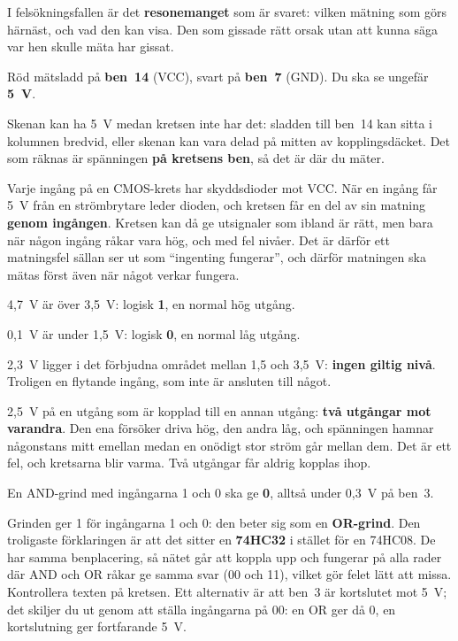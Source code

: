 

I felsökningsfallen är det \textbf{resonemanget} som är svaret: vilken mätning som görs härnäst, och
vad den kan visa. Den som gissade rätt orsak utan att kunna säga var hen skulle mäta har gissat.

Röd mätsladd på \textbf{ben~14} (VCC), svart på \textbf{ben~7} (GND). Du ska se ungefär
\textbf{5~V}.

Skenan kan ha 5~V medan kretsen inte har det: sladden till ben~14 kan sitta i kolumnen
bredvid, eller skenan kan vara delad på mitten av kopplingsdäcket. Det som räknas är spänningen
\textbf{på kretsens ben}, så det är där du mäter.

Varje ingång på en CMOS-krets har skyddsdioder mot VCC. När en ingång får 5~V från en
strömbrytare leder dioden, och kretsen får en del av sin matning \textbf{genom ingången}. Kretsen
kan då ge utsignaler som ibland är rätt, men bara när någon ingång råkar vara hög, och med fel
nivåer. Det är därför ett matningsfel sällan ser ut som \enquote{ingenting fungerar}, och därför
matningen ska mätas först även när något verkar fungera.

4,7~V är över 3,5~V: logisk \textbf{1}, en normal hög utgång.

0,1~V är under 1,5~V: logisk \textbf{0}, en normal låg utgång.

2,3~V ligger i det förbjudna området mellan 1,5 och 3,5~V: \textbf{ingen giltig nivå}.
Troligen en flytande ingång, som inte är ansluten till något.

2,5~V på en utgång som är kopplad till en annan utgång: \textbf{två utgångar mot varandra}.
Den ena försöker driva hög, den andra låg, och spänningen hamnar någonstans mitt emellan medan en
onödigt stor ström går mellan dem. Det är ett fel, och kretsarna blir varma. Två utgångar får
aldrig kopplas ihop.

En AND-grind med ingångarna 1 och 0 ska ge \textbf{0}, alltså under 0,3~V på ben~3.

Grinden ger 1 för ingångarna 1 och 0: den beter sig som en \textbf{OR-grind}. Den troligaste
förklaringen är att det sitter en \textbf{74HC32} i stället för en 74HC08. De har samma
benplacering, så nätet går att koppla upp och fungerar på alla rader där AND och OR råkar ge samma
svar (00 och 11), vilket gör felet lätt att missa. Kontrollera texten på kretsen. Ett alternativ är
att ben~3 är kortslutet mot 5~V; det skiljer du ut genom att ställa ingångarna på 00: en OR ger då
0, en kortslutning ger fortfarande 5~V.

